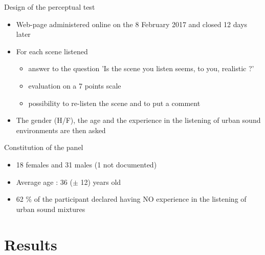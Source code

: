 \documentclass{beamer}
\begin{document}
\begin{frame}{Design of the perceptual test}
\begin{itemize}
	\item Web-page administered online on the 8 February 2017 and closed 12 days later
	\item For each scene listened
	\begin{itemize}
		\item answer to the question 'Is the scene you listen seems, to you, realistic ?'
		\item evaluation on a 7 points scale 
		\item possibility to re-listen the scene and to put a comment
	\end{itemize}
	\item The gender (H/F), the age and the experience in the listening of urban sound environments are then asked
\end{itemize}

\begin{block}{Constitution of the panel}
\begin{itemize}
	\item 18 females and 31 males (1 not documented)
	\item Average age : 36 ($\pm$ 12) years old
	\item 62 $\%$ of the participant declared having NO experience in the listening of urban sound mixtures
\end{itemize}
\end{block}

\end{frame}

\section{Results}
%
%
\end{document}
